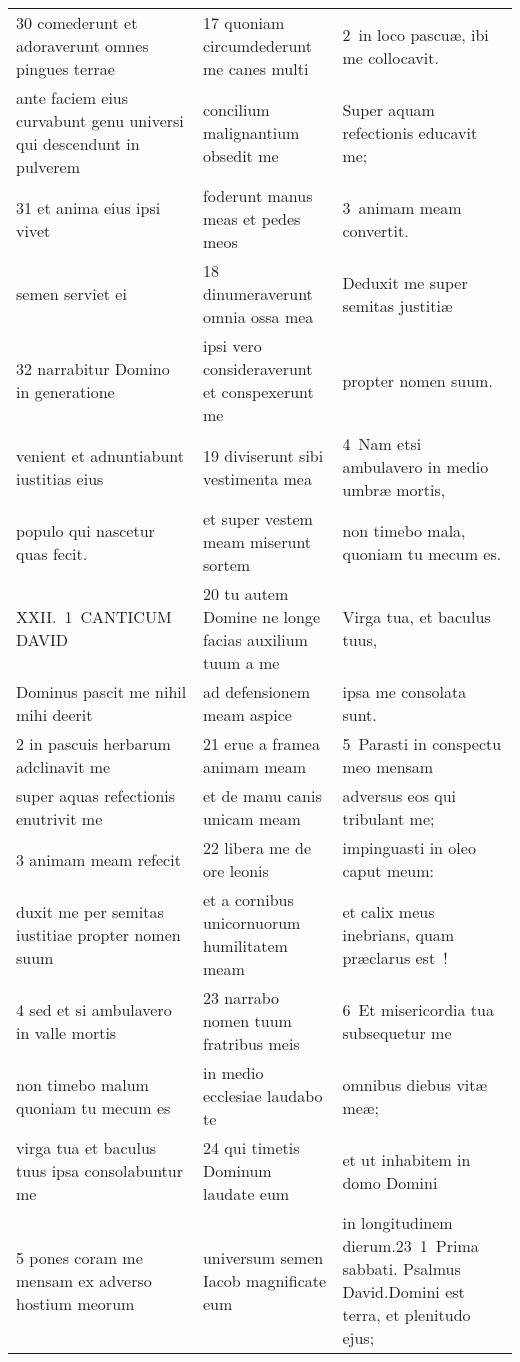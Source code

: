 \documentclass{article}
\begin{document}
\begin{longtable}{@{}p{}p{}p{}@{}}
30 comederunt et adoraverunt omnes pingues terrae	&	17 quoniam circumdederunt me canes multi	&	2 in loco pascuæ, ibi me collocavit.	\\
ante faciem eius curvabunt genu universi qui descendunt in pulverem	&	concilium malignantium obsedit me	&	Super aquam refectionis educavit me;	\\
31 et anima eius ipsi vivet	&	foderunt manus meas et pedes meos	&	3 animam meam convertit.	\\
semen serviet ei	&	18 dinumeraverunt omnia ossa mea	&	Deduxit me super semitas justitiæ	\\
32 narrabitur Domino in generatione	&	ipsi vero consideraverunt et conspexerunt me	&	propter nomen suum.	\\
venient et adnuntiabunt iustitias eius	&	19 diviserunt sibi vestimenta mea	&	4 Nam etsi ambulavero in medio umbræ mortis,	\\
populo qui nascetur quas fecit.	&	et super vestem meam miserunt sortem	&	non timebo mala, quoniam tu mecum es.	\\
XXII. 1 CANTICUM DAVID	&	20 tu autem Domine ne longe facias auxilium tuum a me	&	Virga tua, et baculus tuus,	\\
Dominus pascit me nihil mihi deerit	&	ad defensionem meam aspice	&	ipsa me consolata sunt.	\\
2 in pascuis herbarum adclinavit me	&	21 erue a framea animam meam	&	5 Parasti in conspectu meo mensam	\\
super aquas refectionis enutrivit me	&	et de manu canis unicam meam	&	adversus eos qui tribulant me;	\\
3 animam meam refecit	&	22 libera me de ore leonis	&	impinguasti in oleo caput meum:	\\
duxit me per semitas iustitiae propter nomen suum	&	et a cornibus unicornuorum humilitatem meam	&	et calix meus inebrians, quam præclarus est !	\\
4 sed et si ambulavero in valle mortis	&	23 narrabo nomen tuum fratribus meis	&	6 Et misericordia tua subsequetur me	\\
non timebo malum quoniam tu mecum es	&	in medio ecclesiae laudabo te	&	omnibus diebus vitæ meæ;	\\
virga tua et baculus tuus ipsa consolabuntur me	&	24 qui timetis Dominum laudate eum	&	et ut inhabitem in domo Domini	\\
5 pones coram me mensam ex adverso hostium meorum	&	universum semen Iacob magnificate eum	&	in longitudinem dierum.23 1 Prima sabbati. Psalmus David.Domini est terra, et plenitudo ejus;	\\

\end{longtable}
\end{document}
